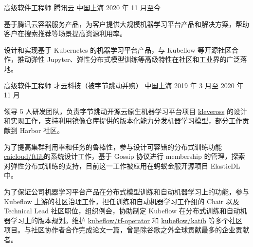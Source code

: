 

\begin{cventries}

  \cventry
    {高级软件工程师} %
    {腾讯云} %
    {中国上海} %
    {2020 年 11 月至今} %
    {
      \begin{cvitems}
        \item 基于腾讯云容器服务产品，为客户提供大规模机器学习平台产品和解决方案，帮助客户在搜索推荐等场景提高资源利用率。
        \item 设计和实现基于 Kubernetes 的机器学习平台产品，与 Kubeflow 等开源社区合作，推动弹性 Jupyter、弹性分布式模型训练等高级特性在社区和工业界的广泛落地。
      \end{cvitems}
    }

  \cventry
    {高级软件工程师} %
    {才云科技（被字节跳动并购）} %
    {中国上海} %
    {2019 年 3 月至 2020 年 11 月} %
    {
      \begin{cvitems} %
        \item 领导 5 人研发团队，负责字节跳动开源云原生机器学习平台项目 \href{https://github.com/kleveross/ormb}{kleveross} 的设计和实现工作，支持利用镜像仓库提供的版本化能力分发机器学习模型，部分工作贡献到 Harbor 社区。
        \item 为了提高集群利用率和任务的鲁棒性，参与设计可容错的分布式训练功能 \href{https://github.com/caicloud/ftlib}{caicloud/ftlib}的系统设计工作，基于 Gossip 协议进行 membership 的管理，探索对弹性分布式训练的支持，目前这一工作被应用在蚂蚁金服开源项目 ElasticDL 中。
        \item 为了保证公司机器学习平台产品在分布式模型训练和自动机器学习上的功能，参与 Kubeflow 上游的社区治理工作，担任训练和自动机器学习工作组的 Chair 以及 Technical Lead 社区职位，组织例会，协助制定 Kubeflow 在分布式训练和自动机器学习上的版本规划。维护 \href{https://github.com/kubeflow/tf-operator}{kubeflow/tf-operator} 和 \href{https://github.com/kubeflow/katib}{kubeflow/katib} 等多个社区项目。与社区协作者合作完成论文一篇，曾是除谷歌之外全球贡献最多的企业贡献者。
      \end{cvitems}
    }


\end{cventries}
